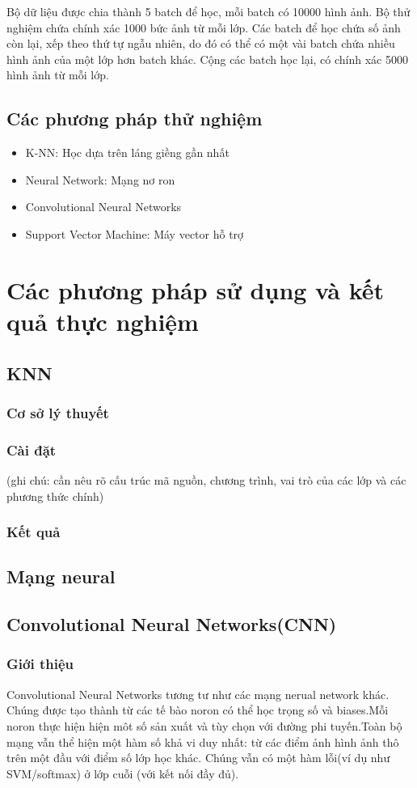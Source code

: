 \documentclass[a4paper,12pt]{report}
\begin{document}
Bộ dữ liệu được chia thành 5 batch để học, mỗi batch có 10000 hình ảnh. Bộ thử nghiệm chứa chính xác 1000 bức ảnh từ mỗi lớp. Các batch để học chứa số ảnh còn lại, xếp theo thứ tự ngẫu nhiên, do đó có thể có một vài batch chứa nhiều hình ảnh của một lớp hơn batch khác. Cộng các batch học lại, có chính xác 5000 hình ảnh từ mỗi lớp.
\section{Các phương pháp thử nghiệm}
\begin{itemize}
\item K-NN: Học dựa trên láng giềng gần nhất
\item Neural Network: Mạng nơ ron
\item Convolutional Neural Networks
\item Support Vector Machine: Máy vector hỗ trợ
\end{itemize}
\chapter{Các phương pháp sử dụng và kết quả thực nghiệm}
\section{KNN}
\subsection{Cơ sở lý thuyết}
\subsection{Cài đặt}
(ghi chú: cần nêu rõ cấu trúc mã nguồn, chương trình, vai trò của các lớp và các phương thức chính)

\subsection{Kết quả}
\section{Mạng neural}
\section{Convolutional Neural Networks(CNN)}
\subsection{Giới thiệu}
Convolutional Neural Networks tương tư như các mạng nerual network khác. Chúng được tạo thành từ các tế bào noron có thể học trọng số và biases.Mỗi noron thực hiện hiện môt số sản xuất và tùy chọn với đường phi tuyến.Toàn bộ mạng vẫn thể hiện một hàm số khả vi duy nhất: từ các điểm ảnh hình ảnh thô trên một đầu với điểm số lớp học khác. Chúng vẫn có một hàm lỗi(ví dụ như SVM/softmax) ở lớp cuỗi (với kết nối đầy đủ).
\end{document}

